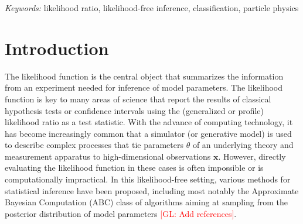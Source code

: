 \documentclass[12pt]{article}
\numberwithin{equation}{section}
\theoremstyle{plain}
\newcommand{\glnote}[1]{\textcolor{red}{[GL: #1]}}
\begin{document}
\noindent%
{\it Keywords:}  likelihood ratio, likelihood-free inference, classification, particle physics
\vfill

\newpage
{} %

\section{Introduction}
\label{sec:introduction}


The likelihood function is the central object that summarizes the information
from an experiment needed for inference of model parameters. The likelihood
function is key to many areas of science that report the results of classical
hypothesis tests or confidence intervals using the (generalized or profile)
likelihood ratio as a test statistic. With the advance of computing technology,
it has become increasingly common that a simulator (or generative model) is used
to describe complex processes that tie parameters $\theta$ of an underlying
theory and measurement apparatus to high-dimensional observations $\mathbf{x}$. However,
directly evaluating the likelihood function in these cases is often impossible
or is computationally impractical. In this likelihood-free setting, various
methods for statistical inference have been proposed, including most notably the
Approximate Bayesian Computation (ABC) class of algorithms aiming at sampling
from the posterior distribution of model parameters \glnote{Add references}.
\end{document}
